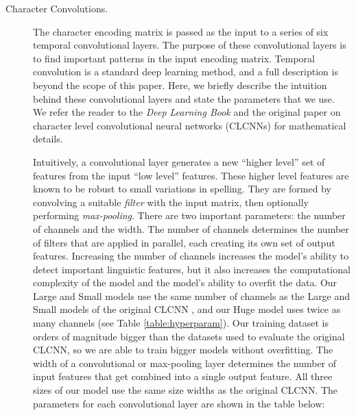 \documentclass[sigconf,anonymous,review]{acmart}
\newcommand{\defn}[1]{\textit{#1}}
\begin{document}
\begin{description}

\item[Character Convolutions.]
    The character encoding matrix is passed as the input to a series of six temporal convolutional layers.
    The purpose of these convolutional layers is to find important patterns in the input encoding matrix.
    Temporal convolution is a standard deep learning method,
    and a full description is beyond the scope of this paper.
    Here, we briefly describe the intuition behind these convolutional layers and state the parameters that we use.
    We refer the reader to the \emph{Deep Learning Book} \citep{Goodfellow-et-al-2016} and 
    the original paper on character level convolutional neural networks (CLCNNs) \citep{zhang2015character} for mathematical details.

    Intuitively, a convolutional layer generates a new ``higher level'' set of features from the input ``low level'' features.
    These higher level features are known to be robust to small variations in spelling.
    They are formed by convolving a suitable \defn{filter} with the input matrix, 
    then optionally performing \defn{max-pooling}.
    There are two important parameters: the number of channels and the width.
    The number of channels determines the number of filters that are applied in parallel,
    each creating its own set of output features.
    Increasing the number of channels increases the model's ability to detect important linguistic features,
    but it also increases the computational complexity of the model and the model's ability to overfit the data.
    Our Large and Small models use the same number of channels as the Large and Small models of the original CLCNN \citep{zhang2015character},
    and our Huge model uses twice as many channels (see Table \ref{table:hyperparam}).
    Our training dataset is orders of magnitude bigger than the datasets used to evaluate the original CLCNN,
    so we are able to train bigger models without overfitting.
    The width of a convolutional or max-pooling layer determines the number of input features that get combined into a single output feature.
    All three sizes of our model use the same size widths as the original CLCNN.
    The parameters for each convolutional layer are shown in the table below:


\end{description}
\end{document}
